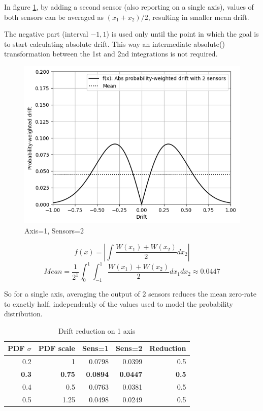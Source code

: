 \documentclass[10pt, twocolumn, a4paper]{article}
\begin{document}
            In figure \ref{fig_zero_12}, by adding a second sensor (also reporting on a single axis), values of both sensors can be averaged as $ (x_1 + x_2)/2 $, resulting in smaller mean drift.

            The negative part (interval $-1,1$) is used only until the point in which the goal is to start calculating absolute drift. This way an intermediate absolute() transformation between the 1st and 2nd integrations is not required.
            \begin{figure}[H]
                \begin{center}
                    \caption{Axis=1, Sensors=2}
                    \label{fig_zero_12}
                    \includegraphics[width=0.8\linewidth]{figure_drift_2.png}
                \end{center}
            \end{figure}
            \vspace{-8mm}
            $$ f(x) = \left| \int \frac{ W(x_1) + W(x_2) }{2} dx_2 \right| $$
            $$ Mean = \frac{1}{2^1} \int_0^1 \int_{-1}^1 \frac{ W(x_1) + W(x_2) }{2} dx_1 dx_2  \approx 0.0447 $$

            So for a single axis, averaging the output of 2 sensors reduces the mean zero-rate to exactly half, independently of the values used to model the probability distribution.
            \begin{table}[H]
                \caption{Drift reduction on 1 axis}
                \vspace{2mm}
                \begin{tabular}{|r|r|r|r|r|}
                    \hline
                        PDF $\sigma$ & PDF scale & Sens=1 & Sens=2 & Reduction \\
                    \hline
                        0.2 &    1 & 0.0798 & 0.0399 & 0.5 \\
                        \textbf{0.3} & \textbf{0.75} & \textbf{0.0894} & \textbf{0.0447} & \textbf{0.5} \\
                        0.4 &  0.5 & 0.0763 & 0.0381 & 0.5 \\
                        0.5 & 1.25 & 0.0498 & 0.0249 & 0.5 \\
                    \hline
                \end{tabular}
            \end{table}
\end{document}
